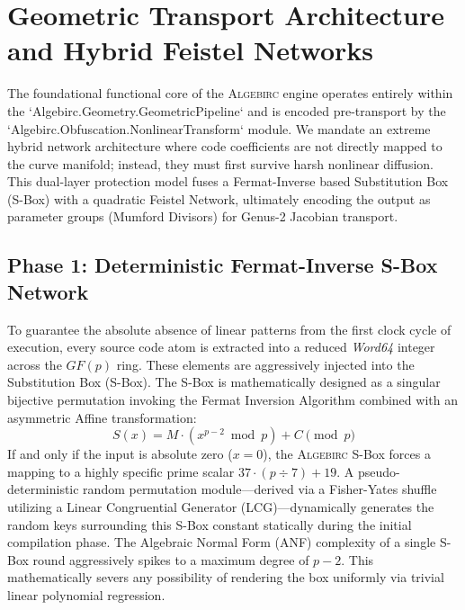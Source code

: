\section{Geometric Transport Architecture and Hybrid Feistel Networks}
\label{sec:geometry}

The foundational functional core of the \textsc{Algebirc} engine operates entirely within the `Algebirc.Geometry.GeometricPipeline` and is encoded pre-transport by the `Algebirc.Obfuscation.NonlinearTransform` module. We mandate an extreme hybrid network architecture where code coefficients are not directly mapped to the curve manifold; instead, they must first survive harsh nonlinear diffusion. This dual-layer protection model fuses a Fermat-Inverse based Substitution Box (S-Box) with a quadratic Feistel Network, ultimately encoding the output as parameter groups (Mumford Divisors) for Genus-2 Jacobian transport.

\subsection{Phase 1: Deterministic Fermat-Inverse S-Box Network}
To guarantee the absolute absence of linear patterns from the first clock cycle of execution, every source code atom is extracted into a reduced \textit{Word64} integer across the $GF(p)$ ring. These elements are aggressively injected into the Substitution Box (S-Box). The S-Box is mathematically designed as a singular bijective permutation invoking the Fermat Inversion Algorithm combined with an asymmetric Affine transformation:
\begin{equation}
    S(x) = M \cdot \left( x^{p-2} \bmod p \right) + C \pmod p
\end{equation}
If and only if the input is absolute zero ($x=0$), the \textsc{Algebirc} S-Box forces a mapping to a highly specific prime scalar $37 \cdot (p \div 7) + 19$. A pseudo-deterministic random permutation module—derived via a Fisher-Yates shuffle utilizing a Linear Congruential Generator (LCG)—dynamically generates the random keys surrounding this S-Box constant statically during the initial compilation phase. The Algebraic Normal Form (ANF) complexity of a single S-Box round aggressively spikes to a maximum degree of $p-2$. This mathematically severs any possibility of rendering the box uniformly via trivial linear polynomial regression.

